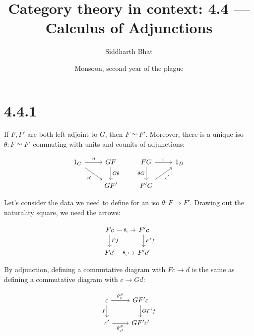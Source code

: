 \documentclass[14pt]{article}
\title{Category theory in context: 4.4 --- Calculus of Adjunctions}
\author{Siddharth Bhat}
\date{Monsoon, second year of the plague}
\begin{document}
\maketitle

\section{4.4.1}

If $F, F'$ are both left adjoint to $G$, then $F \simeq F'$. Moreover, there is a unique
iso $\theta: F \simeq F'$ commuting with units and counits of adjunctions:

\[\begin{tikzcd}
    {1_C} & GF & FG & {1_D} \\
    & {GF'} & {F'G}
    \arrow["\eta", from=1-1, to=1-2]
    \arrow["G\theta", from=1-2, to=2-2]
    \arrow["{\eta'}"', from=1-1, to=2-2]
    \arrow["\epsilon", from=1-3, to=1-4]
    \arrow["{\theta G}"', from=1-3, to=2-3]
    \arrow["{\epsilon'}"', from=2-3, to=1-4]
\end{tikzcd}\]


Let's consider the data we need to define for an iso $\theta: F \Rightarrow F'$. Drawing out the naturality square, we need the arrows:

\[\begin{tikzcd}
    Fc & {F'c} \\
    {Fc'} & {F'c'}
    \arrow["Ff", from=1-1, to=2-1]
    \arrow["{F'f}", from=1-2, to=2-2]
    \arrow["{\theta_c}"{description}, from=1-1, to=1-2]
    \arrow["{\theta_{c'}}"{description}, from=2-1, to=2-2]
\end{tikzcd}\]

By adjunction, defining a commutative diagram with $Fc \rightarrow d$ is the same as defining a commutative
diagram with $c \rightarrow Gd$:

\[\begin{tikzcd}
    c & {GF'c} \\
    {c'} & {GF'c'}
    \arrow["f"', from=1-1, to=2-1]
    \arrow["{GF'f}", from=1-2, to=2-2]
    \arrow["{\theta_c^\#}", from=1-1, to=1-2]
    \arrow["{\theta^\#_{c'}}"', from=2-1, to=2-2]
\end{tikzcd}\]
\end{document}
